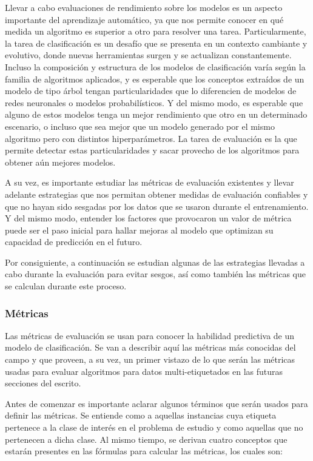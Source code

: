Llevar a cabo evaluaciones de rendimiento sobre los modelos es un aspecto
importante del aprendizaje automático, ya que nos permite conocer en qué medida
un algoritmo es superior a otro para resolver una tarea. Particularmente, la
tarea de clasificación es un desafío que se presenta en un contexto cambiante y
evolutivo, donde nuevas herramientas surgen y se actualizan constantemente.
Incluso la composición y estructura de los modelos de clasificación varía según
la familia de algoritmos aplicados, y es esperable que los conceptos extraídos
de un modelo de tipo árbol tengan particularidades que lo diferencien de modelos
de redes neuronales o modelos probabilísticos. Y del mismo modo, es esperable
que alguno de estos modelos tenga un mejor rendimiento que otro en un
determinado escenario, o incluso que sea mejor que un modelo generado por el
mismo algoritmo pero con distintos hiperparámetros. La tarea de evaluación es
la que permite detectar estas particularidades y sacar provecho de los
algoritmos para obtener aún mejores modelos.

A su vez, es importante estudiar las métricas de evaluación existentes y llevar
adelante estrategias que nos permitan obtener medidas de evaluación confiables y
que no hayan sido sesgadas por los datos que se usaron durante el entrenamiento.
Y del mismo modo, entender los factores que provocaron un valor de métrica puede
ser el paso inicial para hallar mejoras al modelo que optimizan su capacidad de
predicción en el futuro.

Por consiguiente, a continuación se estudian algunas de las estrategias llevadas
a cabo durante la evaluación para evitar sesgos, así como también las métricas
que se calculan durante este proceso.

\subsubsection{Métricas}
\label{evaluacion_metricas}

Las métricas de evaluación se usan para conocer la habilidad predictiva de un
modelo de clasificación. Se van a describir aquí las métricas más conocidas del
campo y que proveen, a su vez, un primer vistazo de lo que serán las métricas
usadas para evaluar algoritmos para datos multi-etiquetados en las futuras
secciones del escrito.

Antes de comenzar es importante aclarar algunos términos que serán usados para
definir las métricas. Se entiende como  a aquellas
instancias cuya etiqueta pertenece a la clase de interés en el problema de
estudio y  como aquellas que no pertenecen a dicha
clase. Al mismo tiempo, se derivan cuatro conceptos que estarán presentes en las
fórmulas para calcular las métricas, los cuales son:

